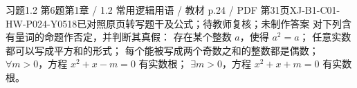 \par\noindent\begin{minipage}{\linewidth}
\begin{bankitem}{习题1.2 第6题}{第1章 / 1.2 常用逻辑用语 / 教材 p.24 / PDF 第31页}{XJ-B1-C01-HW-P024-Y0518}{已对照原页转写题干及公式；待教师复核；未制作答案}
对下列含有量词的命题作否定，并判断其真假：
存在某个整数 $a$，使得 $a^2=a$；
任意实数都可以写成平方和的形式；
每个能被写成两个奇数之和的整数都是偶数；
$\forall m>0$，方程 $x^2+x-m=0$ 有实数根；
$\exists m>0$，方程 $x^2+x+m=0$ 有实数根。
\end{bankitem}
\end{minipage}\par\medskip
